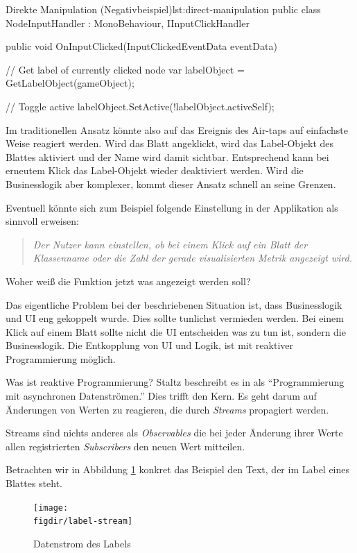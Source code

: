 \begin{codesnippet}{Direkte Manipulation (Negativbeispiel)}{lst:direct-manipulation}
public class NodeInputHandler : MonoBehaviour, IInputClickHandler
{
    public void OnInputClicked(InputClickedEventData eventData)
    {
        // Get label of currently clicked node
        var labelObject = GetLabelObject(gameObject);

        // Toggle active
        labelObject.SetActive(!labelObject.activeSelf);
    }
}
\end{codesnippet}

Im traditionellen Ansatz könnte also auf das Ereignis des Air-taps auf einfachste Weise reagiert werden. Wird das Blatt angeklickt, wird das Label-Objekt des Blattes aktiviert und der Name wird damit sichtbar. Entsprechend kann bei erneutem Klick das Label-Objekt wieder deaktiviert werden. Wird die Businesslogik aber komplexer, kommt dieser Ansatz schnell an seine Grenzen.

Eventuell könnte sich zum Beispiel folgende Einstellung in der Applikation als sinnvoll erweisen:

\begin{quotation}
  \textit{Der Nutzer kann einstellen, ob bei einem Klick auf ein Blatt der Klassenname oder die Zahl der gerade visualisierten Metrik angezeigt wird.}
\end{quotation}

Woher weiß die Funktion jetzt was angezeigt werden soll?

Das eigentliche Problem bei der beschriebenen Situation ist, dass Businesslogik und UI eng gekoppelt wurde. Dies sollte tunlichst vermieden werden. Bei einem Klick auf einem Blatt sollte nicht die UI entscheiden was zu tun ist, sondern die Businesslogik. Die Entkopplung von UI und Logik, ist mit reaktiver Programmierung möglich.

Was ist reaktive Programmierung? Staltz beschreibt es in \cite{staltz2016introduction} als "`Programmierung mit asynchronen Datenströmen."' Dies trifft den Kern. Es geht darum auf Änderungen von Werten zu reagieren, die durch \textit{Streams} propagiert werden.

Streams sind nichts anderes als \textit{Observables} die bei jeder Änderung ihrer Werte allen registrierten \textit{Subscribers} den neuen Wert mitteilen.

Betrachten wir in Abbildung \ref{fig:label-stream} konkret das Beispiel den Text, der im Label eines Blattes steht.

\begin{figure}[htb]
  \texttt{[image: \\figdir/label-stream]}
  \caption{Datenstrom des Labels}
  \label{fig:label-stream}
\end{figure}

